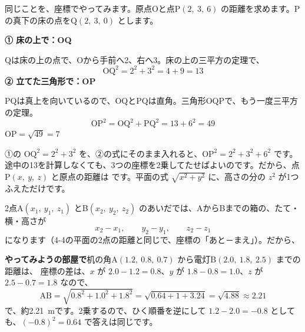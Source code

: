同じことを、座標でやってみます。原点Oと点P$(2,\ 3,\ 6)$ の距離を求めます。Pの真下の床の点をQ$(2,\ 3,\ 0)$ とします。

\noindent\begin{minipage}[c]{0.4\linewidth}
\centering
{}
\end{minipage}\hfill
\begin{minipage}[c]{0.56\linewidth}
\textbf{① 床の上で：OQ}\par
Qは床の上の点で、Oから手前へ2、右へ3。床の上の三平方の定理で、
\[ \mathrm{OQ}^2=2^2+3^2=4+9=13 \]
\textbf{② 立てた三角形で：OP}\par
PQは真上を向いているので、OQとPQは直角。三角形OQPで、もう一度三平方の定理。
\[ \mathrm{OP}^2=\mathrm{OQ}^2+\mathrm{PQ}^2=13+6^2=49 \]
$\mathrm{OP}=\sqrt{49}=7$
\end{minipage}

\par\vspace{4pt}
①の $\mathrm{OQ}^2=2^2+3^2$ を、②の式にそのまま入れると、$\mathrm{OP}^2=2^2+3^2+6^2$ です。途中の13を計算しなくても、3つの座標を2乗してたせばよいのです。だから、点P$(x,\ y,\ z)$ と原点の距離は
です。平面の式 $\sqrt{x^2+y^2}$ に、高さの分の $z^2$ が1つふえただけです。

2点A$(x_1,\ y_1,\ z_1)$ とB$(x_2,\ y_2,\ z_2)$ のあいだでは、AからBまでの箱の、たて・横・高さが
\[ x_2-x_1,\qquad y_2-y_1,\qquad z_2-z_1 \]
になります（4-4の平面の2点の距離と同じで、座標の「あと－まえ」）。だから、

\textbf{やってみようの部屋で}\quad 机の角A$(1.2,\ 0.8,\ 0.7)$ から電灯B$(2.0,\ 1.8,\ 2.5)$ までの距離は、
座標の差は、$x$ が $2.0-1.2=0.8$、$y$ が $1.8-0.8=1.0$、$z$ が $2.5-0.7=1.8$ なので、
\[ \mathrm{AB}=\sqrt{0.8^2+1.0^2+1.8^2}=\sqrt{0.64+1+3.24}=\sqrt{4.88}\approx2.21 \]
で、約\qty{2.21}{m}です。2乗するので、ひく順番を逆にして $1.2-2.0=-0.8$ としても、$(-0.8)^2=0.64$ で答えは同じです。

